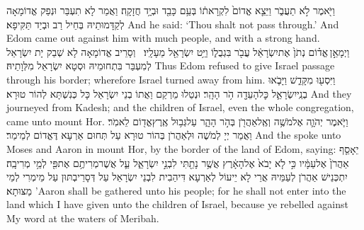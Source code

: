 {וַיֹּ֖אמֶר לֹ֣א תַעֲבֹ֑ר וַיֵּצֵ֤א אֱדוֹם֙ לִקְרָאת֔וֹ בְּעַ֥ם כָּבֵ֖ד וּבְיָ֥ד חֲזָקָֽה׃}
{וַאֲמַר לָא תִעְבַּר וּנְפַק אֱדוֹמָאָה לְקַדָּמוּתֵיהּ בְּחֵיל רַב וּבְיַד תַּקִּיפָא׃}
{And he said: ‘Thou shalt not pass through.’ And Edom came out against him with much people, and with a strong hand.}{}
{וַיְמָאֵ֣ן \legarmeh  אֱד֗וֹם נְתֹן֙ אֶת\maqqaf יִשְׂרָאֵ֔ל עֲבֹ֖ר בִּגְבֻל֑וֹ וַיֵּ֥ט יִשְׂרָאֵ֖ל מֵעָלָֽיו׃ \petucha }
{וְסָרֵיב אֱדוֹמָאָה לָא שְׁבַק יָת יִשְׂרָאֵל לְמִעְבַּר בִּתְחוּמֵיהּ וּסְטָא יִשְׂרָאֵל מִלְּוָתֵיהּ׃}
{Thus Edom refused to give Israel passage through his border; wherefore Israel turned away from him.}{}
{וַיִּסְע֖וּ מִקָּדֵ֑שׁ וַיָּבֹ֧אוּ בְנֵֽי\maqqaf יִשְׂרָאֵ֛ל כׇּל\maqqaf הָעֵדָ֖ה הֹ֥ר הָהָֽר׃}
{וּנְטַלוּ מֵרְקַם וַאֲתוֹ בְנֵי יִשְׂרָאֵל כָּל כְּנִשְׁתָּא לְהוֹר טוּרָא׃}
{And they journeyed from Kadesh; and the children of Israel, even the whole congregation, came unto mount Hor.}{}
{וַיֹּ֧אמֶר יְהֹוָ֛ה אֶל\maqqaf מֹשֶׁ֥ה וְאֶֽל\maqqaf אַהֲרֹ֖ן בְּהֹ֣ר הָהָ֑ר עַל\maqqaf גְּב֥וּל אֶֽרֶץ\maqqaf אֱד֖וֹם לֵאמֹֽר׃}
{וַאֲמַר יְיָ לְמֹשֶׁה וּלְאַהֲרֹן בְּהוֹר טוּרָא עַל תְּחוּם אַרְעָא דֶּאֱדוֹם לְמֵימַר׃}
{And the \lord\space spoke unto Moses and Aaron in mount Hor, by the border of the land of Edom, saying:}{}
{יֵאָסֵ֤ף אַהֲרֹן֙ אֶל\maqqaf עַמָּ֔יו כִּ֣י לֹ֤א יָבֹא֙ אֶל\maqqaf הָאָ֔רֶץ אֲשֶׁ֥ר נָתַ֖תִּי לִבְנֵ֣י יִשְׂרָאֵ֑ל עַ֛ל אֲשֶׁר\maqqaf מְרִיתֶ֥ם אֶת\maqqaf פִּ֖י לְמֵ֥י מְרִיבָֽה׃}
{יִתְכְּנֵישׁ אַהֲרֹן לְעַמֵּיהּ אֲרֵי לָא יֵיעוֹל לְאַרְעָא דִּיהַבִית לִבְנֵי יִשְׂרָאֵל עַל דְּסָרֵיבְתּוּן עַל מֵימְרִי לְמֵי מַצּוּתָא׃}
{’Aaron shall be gathered unto his people; for he shall not enter into the land which I have given unto the children of Israel, because ye rebelled against My word at the waters of Meribah.}{}
